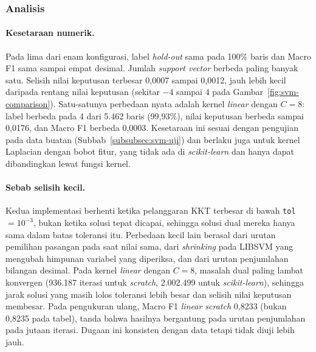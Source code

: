 \subsubsection{Analisis}
\paragraph{Kesetaraan numerik.} Pada lima dari enam konfigurasi, label \textit{hold-out} sama pada 100\% baris dan Macro F1 sama sampai empat desimal. Jumlah \textit{support vector} berbeda paling banyak satu. Selisih nilai keputusan terbesar 0,0007 sampai 0,0012, jauh lebih kecil daripada rentang nilai keputusan (sekitar $-4$ sampai $4$ pada Gambar~\ref{fig:svm-comparison}). Satu-satunya perbedaan nyata adalah kernel \textit{linear} dengan $C = 8$: label berbeda pada 4 dari 5.462 baris (99,93\%), nilai keputusan berbeda sampai 0,0176, dan Macro F1 berbeda 0,0003. Kesetaraan ini sesuai dengan pengujian pada data buatan (Subbab~\ref{subsubsec:svm-uji}) dan berlaku juga untuk kernel Laplacian dengan bobot fitur, yang tidak ada di \textit{scikit-learn} dan hanya dapat dibandingkan lewat fungsi kernel.

\paragraph{Sebab selisih kecil.} Kedua implementasi berhenti ketika pelanggaran KKT terbesar di bawah \texttt{tol} $= 10^{-3}$, bukan ketika solusi tepat dicapai, sehingga solusi dual mereka hanya sama dalam batas toleransi itu. Perbedaan kecil lain berasal dari urutan pemilihan pasangan pada saat nilai sama, dari \textit{shrinking} pada LIBSVM yang mengubah himpunan variabel yang diperiksa, dan dari urutan penjumlahan bilangan desimal. Pada kernel \textit{linear} dengan $C = 8$, masalah dual paling lambat konvergen (936.187 iterasi untuk \textit{scratch}, 2.002.499 untuk \textit{scikit-learn}), sehingga jarak solusi yang masih lolos toleransi lebih besar dan selisih nilai keputusan membesar. Pada pengukuran ulang, Macro F1 \textit{linear scratch} 0,8233 (bukan 0,8235 pada tabel), tanda bahwa hasilnya bergantung pada urutan penjumlahan pada jutaan iterasi. Dugaan ini konsisten dengan data tetapi tidak diuji lebih jauh.

